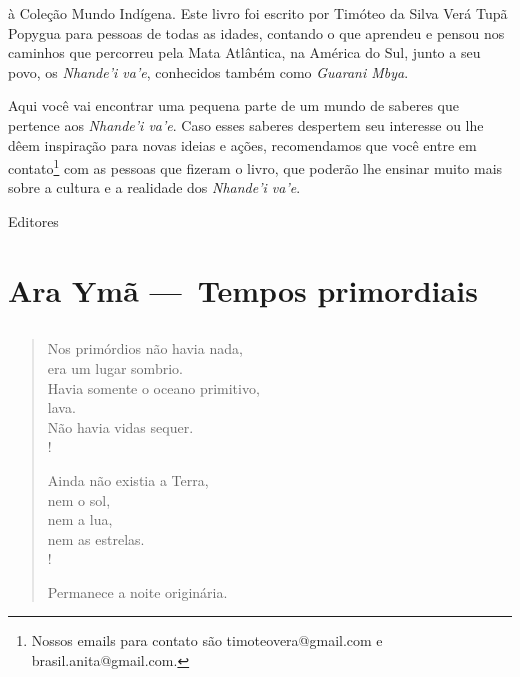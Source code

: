  

 à Coleção Mundo
Indígena. Este livro foi escrito por Timóteo da Silva
Verá Tupã Popygua para pessoas de todas as
idades, contando o que aprendeu e pensou nos caminhos que
percorreu pela Mata Atlântica, na América do Sul, junto a seu
povo, os \textit{Nhande'i va'e}, conhecidos também
como \textit{Guarani Mbya}.

 

Aqui você vai encontrar uma pequena parte de um mundo de saberes
que pertence aos \textit{Nhande'i va'e}. Caso esses saberes
despertem seu interesse ou lhe dêem inspiração para novas ideias e
ações, recomendamos que você entre em
contato\footnote{ Nossos emails para contato são timoteovera@gmail.com
e brasil.anita@gmail.com.} com as pessoas que fizeram o livro, que
poderão lhe ensinar muito mais sobre a cultura e a realidade
dos \textit{Nhande'i va'e}.
\medskip

\hfill Editores
 
\ifodd\relax\else\clearpage\fi

\part[Tempos primordiais]{Ara Ymã — Tempos primordiais}


\chapter*{}

 

\begin{verse}
Nos primórdios não havia nada,\\
era um lugar sombrio.\\
Havia somente o oceano primitivo,\\
lava.\\
Não havia vidas sequer.\\!
 

Ainda não existia a Terra,\\
nem o sol,\\
nem a lua,\\
nem as estrelas.\\!
 
Permanece a noite originária.
\end{verse}
